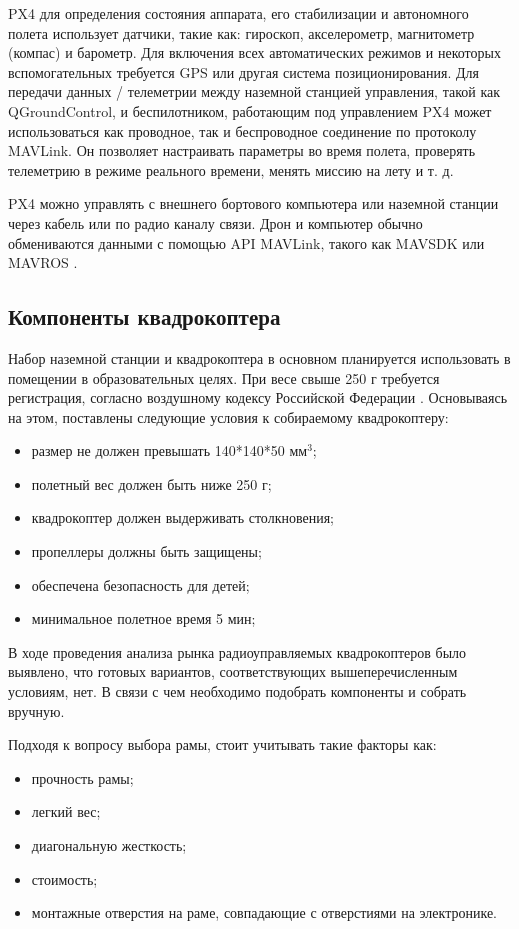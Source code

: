 PX4 для определения состояния аппарата, его стабилизации и автономного полета использует датчики, такие как: гироскоп, акселерометр, магнитометр (компас) и барометр. Для включения всех автоматических режимов и некоторых вспомогательных требуется GPS или другая система позиционирования.
Для передачи данных / телеметрии между наземной станцией управления, такой как Q\-Ground\-Control, и беспилотником, работающим под управлением PX4 может использоваться как проводное, так и беспроводное соединение по протоколу MAVLink. Он позволяет настраивать параметры во время полета, проверять телеметрию в режиме реального времени, менять миссию на лету и т. д.

PX4 можно управлять с внешнего бортового компьютера или наземной станции через кабель или по радио каналу связи. Дрон и компьютер обычно обмениваются данными с помощью API MAVLink, такого как MAVSDK или MAVROS \cite{px4}.

\subsection{Компоненты квадрокоптера}

Набор наземной станции и квадрокоптера в основном планируется использовать в помещении в образовательных целях. При весе свыше 250 г требуется регистрация, согласно воздушному кодексу Российской Федерации \cite{ivp}. Основываясь на этом, поставлены следующие условия к собираемому квадрокоптеру:
\begin{itemize}
	\item размер не должен превышать 140*140*50 \(мм^3\);
	\item полетный вес должен быть ниже 250 г;
	\item квадрокоптер должен выдерживать столкновения;
	\item пропеллеры должны быть защищены;
	\item обеспечена безопасность для детей;
	\item минимальное полетное время 5 мин;
\end{itemize}

В ходе проведения анализа рынка радиоуправляемых квадрокоптеров было выявлено, что готовых вариантов, соответствующих вышеперечисленным условиям, нет. В связи с чем необходимо подобрать компоненты и собрать вручную.

Подходя к вопросу выбора рамы, стоит учитывать такие факторы как:
\begin{itemize}
	\item прочность рамы;
	\item легкий вес;
	\item диагональную жесткость;
	\item стоимость;
	\item монтажные отверстия на раме, совпадающие с отверстиями на электронике.
\end{itemize}

